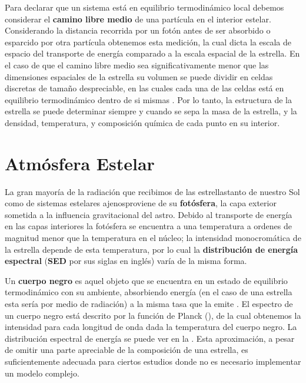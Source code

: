 Para declarar que un sistema está en equilibrio termodinámico local debemos
considerar el \textbf{camino libre medio} de una partícula en el interior
estelar. Considerando la distancia recorrida por un fotón antes de ser absorbido
o esparcido por otra partícula obtenemos esta medición, la cual dicta la escala
de espacio del transporte de energía comparado a la escala espacial de la
estrella. En el caso de que el camino libre medio sea significativamente menor
que las dimensiones espaciales de la estrella su volumen se puede dividir en
celdas discretas de tamaño despreciable, en las cuales cada una de las celdas
está en equilibrio termodinámico dentro de si mismas
. Por lo tanto, la
estructura de la estrella se puede determinar siempre y cuando se sepa la masa
de la estrella, y la densidad, temperatura, y composición química de cada punto
en su interior.

\section{Atmósfera Estelar}

La gran mayoría de la radiación que recibimos de las estrellas\textemdash tanto
de nuestro Sol como de sistemas estelares ajenos\textemdash proviene de su
\textbf{fotósfera}, la capa exterior sometida a la influencia gravitacional del
astro. Debido al transporte de energía en las capas interiores la fotósfera
se encuentra a una temperatura a ordenes de magnitud menor que la temperatura en
el núcleo; la intensidad monocromática de la estrella depende de esta
temperatura, por lo cual la \textbf{distribución de energía espectral}
(\textbf{SED} por sus siglas en inglés) varía de la misma forma.

Un \textbf{cuerpo negro} es aquel objeto que se encuentra en un estado de
equilibrio termodinámico con su ambiente, absorbiendo energía (en el caso de una
estrella esta sería por medio de radiación) a la misma tasa que la emite
. El espectro de un cuerpo
negro está descrito por la función de Planck
(), de la cual obtenemos la intensidad para
cada longitud de onda dada la temperatura del cuerpo negro. La distribución
espectral de energía se puede ver en la .
Esta aproximación, a pesar de omitir una parte apreciable de la composición de
una estrella, es suficientemente adecuada para ciertos estudios donde no es
necesario implementar un modelo complejo.

